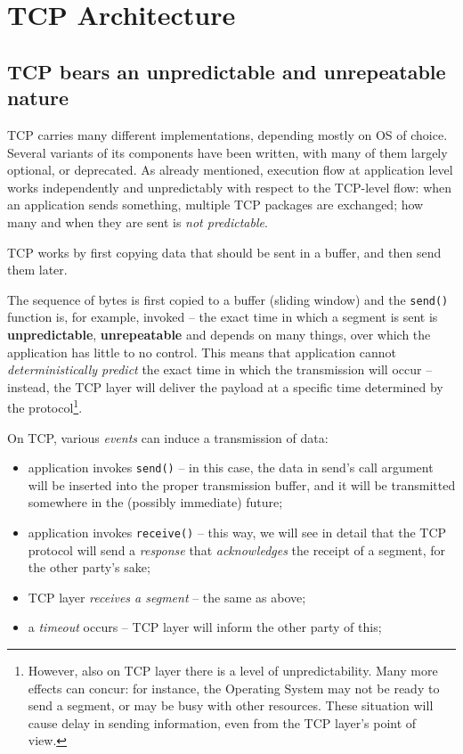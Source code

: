 \documentclass[10pt]{book}
\begin{document}
\section{TCP Architecture}

\subsection{TCP bears an unpredictable and unrepeatable nature}

TCP carries many different implementations, depending mostly on OS of choice.
Several variants of its components have been written, with many of them largely
optional, or deprecated. As already mentioned, execution flow at application
level works independently and unpredictably with respect to the TCP-level flow:
when an application sends something, multiple TCP packages are exchanged;
how many and when they are sent is \emph{not predictable}.

TCP works by first copying data that should be sent in a buffer, and then send
them later.

The sequence of bytes is first copied to a buffer (sliding window) and the
\texttt{send()} function is, for example, invoked \--- the exact time in which a
segment is sent is \textbf{unpredictable}, \textbf{unrepeatable} and depends on
many things, over which the application has little to no control. This means
that application cannot \emph{deterministically predict} the exact time in
which the transmission will occur \--- instead, the TCP layer will deliver the
payload at a specific time determined by the protocol\footnote{However, also on
TCP layer there is a level of unpredictability. Many more effects can concur: for
instance, the Operating System may not be ready to send a segment, or may be
busy with other resources. These situation will cause delay in sending
information, even from the TCP layer's point of view.}.

On TCP, various \emph{events} can induce a transmission of data:

\begin{itemize}
    \item application invokes \texttt{send()} \--- in this case, the data in
        send's call argument will be inserted into the proper transmission
        buffer, and it will be transmitted somewhere in the (possibly
        immediate) future; 
    \item application invokes \texttt{receive()} \--- this way, we will see in
        detail that the TCP protocol will send a \emph{response} that
        \emph{acknowledges} the receipt of a segment, for the other party's
        sake;
    \item TCP layer \emph{receives a segment} \--- the same as above;
    \item a \emph{timeout} occurs \--- TCP layer will inform the other party of
        this;
\end{itemize}
\end{document}
